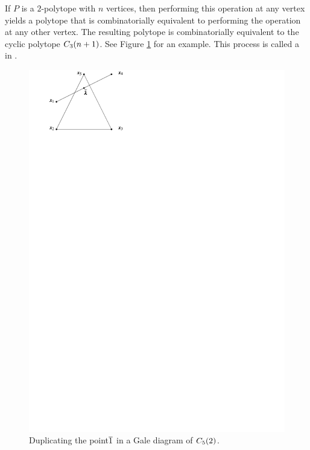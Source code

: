        If \(P\) is a \(2\)-polytope with \(n\) vertices, then performing this operation at any vertex yields a polytope that is combinatorially equivalent to performing the operation at any other vertex.  The resulting polytope is combinatorially equivalent to the cyclic polytope \(\cyc{n+1}3\).  See Figure \ref{Fig:DupGale} for an example.  This process is called a  in \cite{SimplicialWedge}.

        \begin{figure}[p!hbt]
            \centering
                \includegraphics[width=.7\textwidth, page=32]{pictures.pdf}
            \caption{Duplicating the point\protect$\ol1\protect$ in a Gale diagram of \protect$\cyc25\protect$.\label{Fig:DupGale}}
        \end{figure} 
